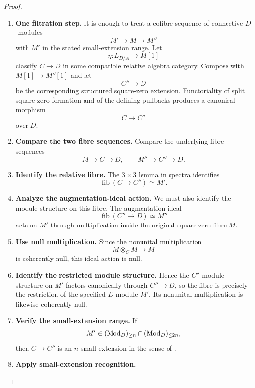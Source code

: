 \begin{proof}
\leavevmode
\begin{enumerate}[label=\textup{(\arabic*)}]
    \item \textbf{One filtration step.}
    It is enough to treat a cofibre sequence of connective \(D\)-modules
    \[
        M'\longrightarrow M\longrightarrow M''
    \]
    with \(M'\) in the stated small-extension range. Let
    \[
        \eta:L_{D/A}\longrightarrow M[1]
    \]
    classify \(C\to D\) in some compatible relative algebra category. Compose
    with \(M[1]\to M''[1]\) and let
    \[
        C''\longrightarrow D
    \]
    be the corresponding structured square-zero extension. Functoriality of
    split square-zero formation and of the defining pullbacks produces a
    canonical morphism
    \[
        C\longrightarrow C''
    \]
    over \(D\).
    \item \textbf{Compare the two fibre sequences.}
    Compare the underlying fibre sequences
    \[
        M\longrightarrow C\longrightarrow D,
        \qquad
        M''\longrightarrow C''\longrightarrow D.
    \]
    \item \textbf{Identify the relative fibre.}
    The \(3\times3\) lemma in spectra identifies
    \[
        \operatorname{fib}(C\to C'')\simeq M'.
    \]
    \item \textbf{Analyze the augmentation-ideal action.}
    We must also identify the module structure on this fibre. The augmentation
    ideal
    \[
        \operatorname{fib}(C''\to D)\simeq M''
    \]
    acts on \(M'\) through multiplication inside the original square-zero fibre
    \(M\).
    \item \textbf{Use null multiplication.}
    Since the nonunital multiplication
    \[
        M\otimes_C M\longrightarrow M
    \]
    is coherently null, this ideal action is null.
    \item \textbf{Identify the restricted module structure.}
    Hence the \(C''\)-module
    structure on \(M'\) factors canonically through \(C''\to D\), so the fibre is
    precisely the restriction of the specified \(D\)-module \(M'\). Its
    nonunital multiplication is likewise coherently null.
    \item \textbf{Verify the small-extension range.}
    If
    \[
        M'\in(\operatorname{Mod}_D)_{\geq n}\cap(\operatorname{Mod}_D)_{\leq2n},
    \]
    then \(C\to C''\) is an \(n\)-small extension in the sense of
    \cite[Theorem~7.4.1.26 and Corollary~7.4.1.27]{LurieHigherAlgebra}.
    \item \textbf{Apply small-extension recognition.}

\end{enumerate}
\end{proof}
